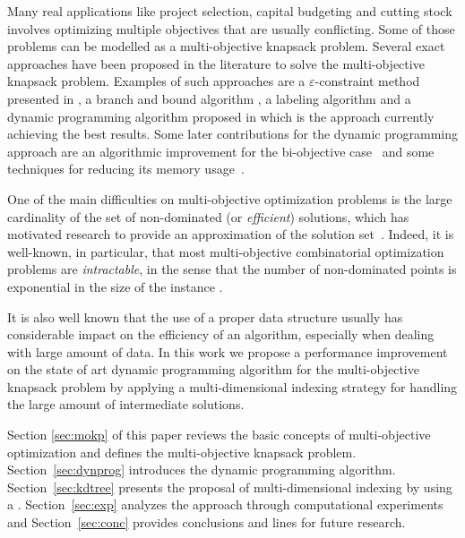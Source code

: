 Many real applications like project selection,
capital budgeting and cutting stock involves
optimizing multiple objectives that are usually conflicting.
Some of those problems can be modelled as a multi-objective
knapsack problem.
Several exact approaches have been proposed in the literature to solve
the multi-objective knapsack problem.
Examples of such approaches are
a $\varepsilon$-constraint method presented in \cite{chankong2008multiobjective},
a branch and bound algorithm  \cite{visee1998two},
a labeling algorithm  \cite{captivo2003solving} and
a dynamic programming algorithm proposed in \cite{bazgan2009}
which is the approach currently achieving the best results.
Some later contributions for the dynamic programming approach are
an algorithmic improvement for the bi-objective
case~\cite{figueira2013algorithmic} and some techniques
for reducing its memory usage~\cite{correia2018}.

One of the main difficulties on multi-objective optimization problems
is the large cardinality of the set of non-dominated (or \emph{efficient}) solutions,
which has motivated research to provide an approximation of the solution
set~\cite{bazgan2015approximate, vanderpooten2017covers}.
Indeed, it is well-known, in particular, that most multi-objective combinatorial
optimization problems are \emph{intractable}, in the sense that
the number of non-dominated points is exponential in the size of the instance
\cite{ehrgott2013multicriteria}.

It is also well known that the use of a proper data structure
usually has considerable impact on the efficiency of an algorithm,
especially when dealing with large amount of data.
In this work we propose a performance improvement
on the state of art dynamic programming algorithm for
the multi-objective knapsack problem
by applying a multi-dimensional indexing strategy
for handling the large amount of intermediate solutions.

Section \ref{sec:mokp} of this paper
reviews the basic concepts of multi-objective optimization
and defines the multi-objective knapsack problem.
Section~\ref{sec:dynprog} introduces the dynamic programming algorithm.
Section~\ref{sec:kdtree} presents the proposal of multi-dimensional
indexing by using a \kdtree{}.
Section~\ref{sec:exp} analyzes the approach through computational experiments and
Section~\ref{sec:conc} provides conclusions and lines for future research.

